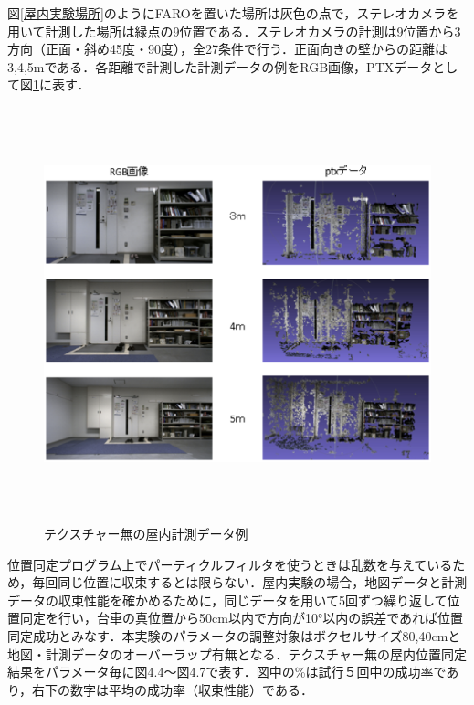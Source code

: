 図{\ref{屋内実験場所}}のようにFAROを置いた場所は灰色の点で，ステレオカメラを用いて計測した場所は緑点の9位置である．ステレオカメラの計測は9位置から3方向（正面・斜め45度・90度），全27条件で行う．正面向きの壁からの距離は3,4,5mである．各距離で計測した計測データの例をRGB画像，PTXデータとして図{\ref{屋内計測データ例}}に表す．

\newpage
%
\begin{figure}[htbp]
  \begin{center}
   \includegraphics[height=120mm]{figure/屋内計測データ例.eps}
   \caption{テクスチャー無の屋内計測データ例}
   \label{屋内計測データ例}
  \end{center}
\end{figure}
%

位置同定プログラム上でパーティクルフィルタを使うときは乱数を与えているため，毎回同じ位置に収束するとは限らない．屋内実験の場合，地図データと計測データの収束性能を確かめるために，同じデータを用いて5回ずつ繰り返して位置同定を行い，台車の真位置から50cm以内で方向が10°以内の誤差であれば位置同定成功とみなす．本実験のパラメータの調整対象はボクセルサイズ80,40cmと地図・計測データのオーバーラップ有無となる．テクスチャー無の屋内位置同定結果をパラメータ毎に図4.4～図4.7で表す．図中の\%は試行５回中の成功率であり，右下の数字は平均の成功率（収束性能）である．



